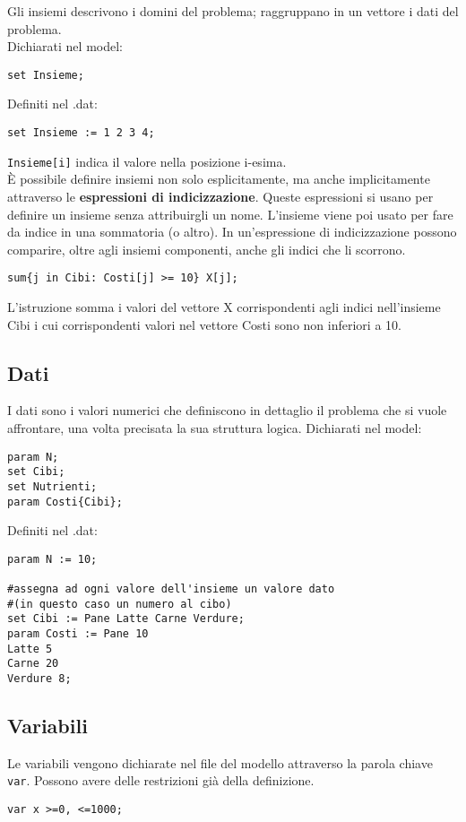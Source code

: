 Gli insiemi descrivono i domini del problema; raggruppano in un vettore i dati del problema. \\
Dichiarati nel model:
\begin{verbatim}
set Insieme;
\end{verbatim}
Definiti nel .dat:
\begin{verbatim}
set Insieme := 1 2 3 4;
\end{verbatim}
\texttt{Insieme[i]} indica il valore nella posizione i-esima. \\

È possibile definire insiemi non solo esplicitamente, ma anche implicitamente attraverso le \textbf{espressioni di indicizzazione}. Queste espressioni si usano per definire un insieme senza attribuirgli un nome. L'insieme viene poi usato per fare da indice in una sommatoria (o altro). In un'espressione di indicizzazione possono comparire, oltre agli insiemi componenti, anche gli indici che li scorrono.
\begin{verbatim}
sum{j in Cibi: Costi[j] >= 10} X[j];
\end{verbatim}
L'istruzione somma i valori del vettore X corrispondenti agli indici nell'insieme Cibi i cui corrispondenti valori nel vettore Costi sono non inferiori a 10.

\subsection{Dati}
I dati sono i valori numerici che definiscono in dettaglio il problema che si vuole affrontare, una volta precisata la sua struttura logica. 
Dichiarati nel model:
\begin{verbatim}
param N;
set Cibi;
set Nutrienti;
param Costi{Cibi};
\end{verbatim}
Definiti nel .dat:
\begin{verbatim}
param N := 10;

#assegna ad ogni valore dell'insieme un valore dato
#(in questo caso un numero al cibo)
set Cibi := Pane Latte Carne Verdure;
param Costi := Pane 10
Latte 5
Carne 20
Verdure 8;
\end{verbatim}

\subsection{Variabili}

Le variabili vengono dichiarate nel file del modello attraverso la parola chiave \texttt{var}. Possono avere delle restrizioni già della definizione.
\begin{verbatim}
var x >=0, <=1000; 
\end{verbatim}

